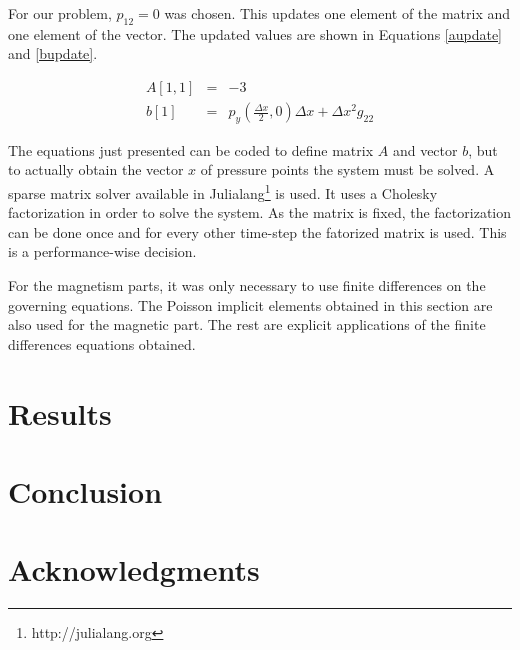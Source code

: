 \documentclass[journal]{IEEEtran}
\begin{document}
For our problem, $p_{12} = 0$ was chosen. This updates one element of the matrix and one element of the vector. The updated values are shown in Equations \ref{aupdate} and \ref{bupdate}.

\begin{eqnarray}
A[1,1] &=& -3 \label{aupdate} \\
b[1] & = & p_y\left(\frac{\Delta x}{2},0\right)\Delta x + \Delta x^2 g_{22} \label{bupdate}
\end{eqnarray}

The equations just presented can be coded to define matrix $A$ and vector $b$, but to actually obtain the vector $x$ of pressure points the system must be solved. A sparse matrix solver available in Julialang\footnote{http://julialang.org} is used. It uses a Cholesky factorization in order to solve the system. As the matrix is fixed, the factorization can be done once and for every other time-step the fatorized matrix is used. This is a performance-wise decision.

For the magnetism parts, it was only necessary to use finite differences on the governing equations. The Poisson implicit elements obtained in this section are also used for the magnetic part. The rest are explicit applications of the finite differences equations obtained.

\section{Results}

\section{Conclusion}

\section*{Acknowledgments}

%





\end{document}
